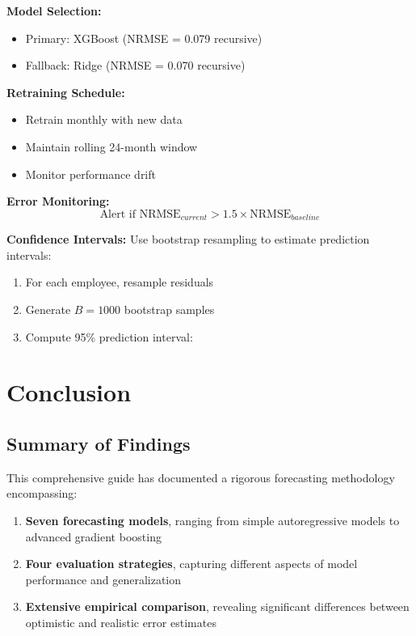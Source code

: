 \documentclass[12pt,a4paper]{article}
\begin{document}
\textbf{Model Selection:}
\begin{itemize}
    \item Primary: XGBoost (NRMSE = 0.079 recursive)
    \item Fallback: Ridge (NRMSE = 0.070 recursive)
\end{itemize}

\textbf{Retraining Schedule:}
\begin{itemize}
    \item Retrain monthly with new data
    \item Maintain rolling 24-month window
    \item Monitor performance drift
\end{itemize}

\textbf{Error Monitoring:}
\begin{equation}
\text{Alert if } \text{NRMSE}_{current} > 1.5 \times \text{NRMSE}_{baseline}
\end{equation}

\textbf{Confidence Intervals:}
Use bootstrap resampling to estimate prediction intervals:
\begin{enumerate}
    \item For each employee, resample residuals
    \item Generate $B = 1000$ bootstrap samples
    \item Compute 95\% prediction interval:
    \begin{equation}
    [\hat{y}_{it} - 1.96 \cdot \hat{\sigma}_i, \quad \hat{y}_{it} + 1.96 \cdot \hat{\sigma}_i]
    \end{equation}
\end{enumerate}

\section{Conclusion}

\subsection{Summary of Findings}

This comprehensive guide has documented a rigorous forecasting methodology encompassing:

\begin{enumerate}
    \item \textbf{Seven forecasting models}, ranging from simple autoregressive models to advanced gradient boosting
    \item \textbf{Four evaluation strategies}, capturing different aspects of model performance and generalization
    \item \textbf{Extensive empirical comparison}, revealing significant differences between optimistic and realistic error estimates
\end{enumerate}
\end{document}
